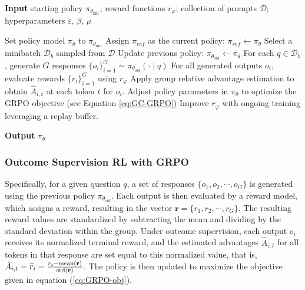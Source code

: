 \begin{itemize}[topsep=0pt]
\begin{algorithm}[t]
  \small
  \caption{Iterative Group Relative Policy Optimization}
  \textbf{Input} starting policy $\pi_{\theta_{\text{init}}}$; reward functions $r_\varphi$; collection of prompts $\mathcal{D}$; 
  hyperparameters $\varepsilon$, $\beta$, $\mu$
  \begin{algorithmic}[1]
    \State Set policy model $\pi_\theta$ to $\pi_{\theta_{\text{init}}}$
       \State Assign $\pi_{ref}$ as the current policy: $\pi_{ref} \leftarrow \pi_{\theta}$
      \State Select a minibatch $\mathcal{D}_b$ sampled from $\mathcal{D}$
      \State Update previous policy: $\pi_{\theta_{old}} \leftarrow \pi_{\theta}$ 
      \State For each $q \in \mathcal{D}_b$, generate $G$ responses $\{o_i\}_{i=1}^G \sim \pi_{\theta_{old}} (\cdot \mid q) $
      \State For all generated outputs $o_i$, evaluate rewards $\{r_i\}_{i=1}^{G}$ using $r_{\varphi}$
      \State Apply group relative advantage estimation to obtain $\hat{A}_{i,t}$ at each token $t$ for $o_i$.
        \State Adjust policy parameters in $\pi_{\theta}$ to optimize the GRPO objective (see Equation \ref{eq:GC-GRPO})
      \EndFor
    \EndFor
    \State Improve $r_\varphi$ with ongoing training leveraging a replay buffer. 
    \EndFor 
  \end{algorithmic}
  \textbf{Output} $\pi_\theta$
  \label{alg:iter-grpo}
\end{algorithm}

\subsubsection{Outcome Supervision RL with GRPO} Specifically, for a given question $q$, a set of responses $\{o_1, o_2, \cdots, o_G\}$ is generated using the previous policy $\pi_{\theta_{old}}$. Each output is then evaluated by a reward model, which assigns a reward, resulting in the vector $\mathbf{r}=\{r_1, r_2, \cdots, r_G\}$. The resulting reward values are standardized by subtracting the mean and dividing by the standard deviation within the group. Under outcome supervision, each output $o_i$ receives its normalized terminal reward, and the estimated advantages $\hat{A}_{i, t}$ for all tokens in that response are set equal to this normalized value, that is, $\hat{A}_{i, t} = \widetilde{r}_i = \frac{r_i- {\rm mean}(\mathbf{r})}{{\rm std}(\mathbf{r})}$. The policy is then updated to maximize the objective given in equation (\ref{eq:GRPO-obj}).


\end{itemize}
